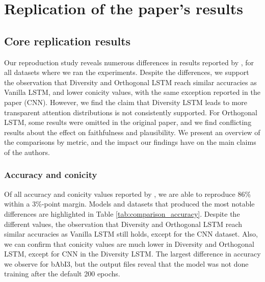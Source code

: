 \section{Replication of the paper's results}

\subsection{Core replication results}
Our reproduction study reveals numerous differences in results reported by \citet{mohankumar_towards_2020}, for all datasets where we ran the experiments.  Despite the differences, we support the observation that Diversity and Orthogonal LSTM reach similar accuracies as Vanilla LSTM, and lower conicity values, with the same exception reported in the paper (CNN).
However, we find the claim that Diversity LSTM leads to more transparent attention distributions is not consistently supported. For Orthogonal LSTM, some results were omitted in the original paper, and we find conflicting results about the effect on faithfulness and plausibility. We present an overview of the comparisons by metric, and the impact our findings have on the main claims of the authors.

\subsubsection{Accuracy and conicity} Of all accuracy and conicity values reported by \citet{mohankumar_towards_2020}, we are able to reproduce 86\% within a 3\%-point margin.
Models and datasets that produced the most notable differences are highlighted in Table \ref{tab:comparison_accuracy}.
Despite the different values, the observation that Diversity and Orthogonal LSTM reach similar accuracies as Vanilla LSTM still holds, except for the CNN dataset.
Also, we can confirm that conicity values are much lower in Diversity and Orthogonal LSTM, except for CNN in the Diversity LSTM.
The largest difference in accuracy we observe for bAbI3, but the output files reveal that the model was not done training after the default 200 epochs.


